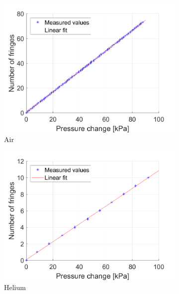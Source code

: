 \begin{figure}[H]
  \centering
  \begin{subfigure}{0.49\textwidth}
    \includegraphics[width=\textwidth]{matlab/Air}
    \caption{Air}
    \label{fig:Air}
  \end{subfigure}
  \begin{subfigure}{0.49\textwidth}
    \includegraphics[width=\textwidth]{matlab/Helium}
    \caption{Helium}
    \label{fig:Helium}
  \end{subfigure}
  \begin{subfigure}{0.49\textwidth}

\end{subfigure}
\end{figure}
